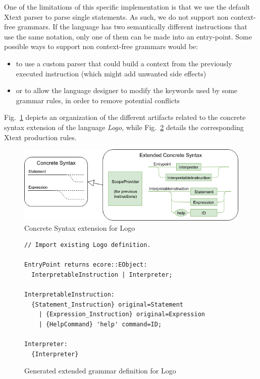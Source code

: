 One of the limitations of this specific implementation is that we use the default Xtext parser to parse single statements.
As such, we do not support non context-free grammars.
If the language has two semantically different instructions that use the same notation, only one of them can be made into an entry-point.
Some possible ways to support non context-free grammars would be:
\begin{itemize}
  \item to use a custom parser that could build a context from the previously executed instruction (which might add unwanted side effects)
  \item or to allow the language designer to modify the keywords used by some grammar rules, in order to remove potential conflicts
\end{itemize}

Fig.~\ref{fig:cs} depicts an organization of the different artifacts related to the concrete syntax extension of the language \textit{Logo}, while Fig.~\ref{fig:ecs} details the corresponding Xtext production rules.

\begin{figure}[t]
	\centering
	\includegraphics[width=\linewidth]{figures/sle_concrete_syntax.png}
	\caption{Concrete Syntax extension for Logo}
	\label{fig:cs}
\end{figure}

\begin{figure}[t]
	\centering
\begin{lstlisting}
// Import existing Logo definition. 

EntryPoint returns ecore::EObject:
  InterpretableInstruction | Interpreter;

InterpretableInstruction:
  {Statement_Instruction} original=Statement
    | {Expression_Instruction} original=Expression
    | {HelpCommand} 'help' command=ID;
  
Interpreter:
  {Interpreter}
	\end{lstlisting}
	\caption{Generated extended grammar definition for Logo}
	\label{fig:ecs}
\end{figure}



